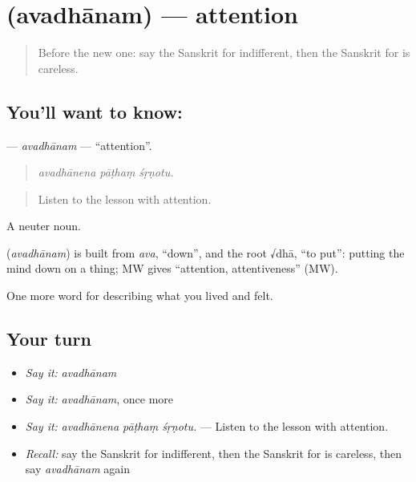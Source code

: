 \section[\texorpdfstring{\sk{अवधानम्} (avadhānam)}{अवधानम् (avadhānam)}]{ (avadhānam) — attention}

\label{lesson:SA-C465-avadhanam}



\begin{quote}
Before the new one: say the Sanskrit for indifferent, then the Sanskrit for is careless.
\end{quote}

\subsection*{You'll want to know: }
\textbf{} — \emph{avadhānam} — \textquotedblleft{}attention\textquotedblright{}.

\begin{quote}
  
\end{quote}

\begin{quote}
\emph{avadhānena pāṭhaṃ śṛṇotu.}
\end{quote}

\begin{quote}
Listen to the lesson with attention.
\end{quote}

A neuter noun.

\begin{cousinweb}
\textbf{} (\emph{avadhānam}) is built from \emph{ava}, \textquotedblleft{}down\textquotedblright{}, and the root √dhā, \textquotedblleft{}to put\textquotedblright{}: putting the mind down on a thing; MW gives \textquotedblleft{}attention, attentiveness\textquotedblright{} (MW).
\end{cousinweb}

\begin{grammarlens}[title={What you've built}]
One more word for describing what you lived and felt.
\end{grammarlens}

\subsection*{Your turn}
\begin{itemize}
\raggedright
  \item \emph{Say it:} \emph{avadhānam}
  \item \emph{Say it:} \emph{avadhānam}, once more
  \item \emph{Say it:} \emph{avadhānena pāṭhaṃ śṛṇotu.} — Listen to the lesson with attention.
  \item \emph{Recall:} say the Sanskrit for indifferent, then the Sanskrit for is careless, then say \emph{avadhānam} again
\end{itemize}


